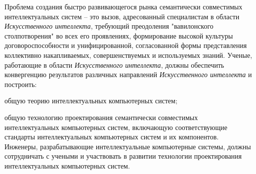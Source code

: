 {Проблема создания быстро развивающегося рынка семантически совместимых интеллектуальных систем – это вызов, адресованный специалистам в области \textit{Искусственного интеллекта}, требующий преодоления "вавилонского столпотворения"{} во всех его проявлениях, формирование высокой культуры договороспособности и унифицированной, согласованной формы представления коллективно накапливаемых, совершенствуемых и используемых знаний.
Ученые, работающие в области \textit{Искусственного интеллекта}, должны обеспечить конвергенцию результатов различных направлений \textit{Искусственного интеллекта} и построить: 
\begin{scnitemize}
\item общую теорию интеллектуальных компьютерных систем; 
\item общую технологию проектирования семантически совместимых интеллектуальных компьютерных систем, включающую соответствующие стандарты интеллектуальных компьютерных систем и их компонентов. Инженеры, разрабатывающие интеллектуальные компьютерные системы, должны сотрудничать с учеными и участвовать в развитии технологии проектирования интеллектуальных компьютерных систем.
\end{scnitemize}
}


